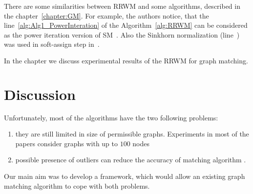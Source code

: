 There are some similarities between RRWM and some algorithms, described in the chapter~\ref{chapter:GM}. For example, the authors notice, that the line~\ref{alg:Alg1_PowerInteration} of the Algorithm~\ref{alg:RRWM} can be considered as the power iteration version of SM~\cite{Leordeanu2005_SM}. Also the Sinkhorn normalization (line~) was used in soft-assign step in~\cite{Rangarajan1996_GAGM}. 

In the chapter  we discuss experimental results of the RRWM for graph matching.

\section{Discussion}

Unfortunately, most of the algorithms have the two following problems:
\begin{enumerate}
\item they are still limited in size of permissible graphs. Experiments in most of the papers consider graphs with up to $100$ nodes \cite{Cho2014_Haystack, Cho2010_RRWM, Cho2012_ProgressiveGM}
\item possible presence of outliers can reduce the accuracy of matching algorithm \cite{Suh_CVPR2015}.
\end{enumerate}  

Our main aim was to develop a framework, which would allow an existing graph matching algorithm to cope with both problems.
